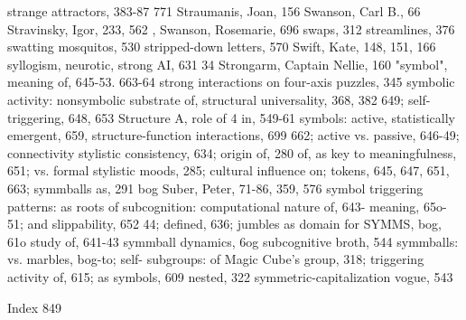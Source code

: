 strange attractors, 383-87                       771
Straumanis, Joan, 156                           Swanson, Carl B., 66
Stravinsky, Igor, 233, 562 ,                    Swanson, Rosemarie, 696 swaps, 312
streamlines, 376                                swatting mosquitos, 530
stripped-down letters, 570                      Swift, Kate, 148, 151, 166 syllogism, neurotic,
strong AI, 631                                   34
Strongarm, Captain Nellie, 160                  "symbol", meaning of, 645-53. 663-64
strong interactions on four-axis puzzles, 345   symbolic activity: nonsymbolic substrate of,
structural universality, 368, 382                649; self-triggering, 648, 653
Structure A, role of 4 in, 549-61               symbols: active, statistically emergent, 659,
structure-function interactions, 699             662; active vs. passive, 646-49; connectivity
stylistic consistency, 634; origin of, 280       of, as key to meaningfulness, 651; vs. formal
stylistic moods, 285; cultural influence on;     tokens, 645, 647, 651, 663; symmballs as,
 291                                             bog
Suber, Peter, 71-86, 359, 576                   symbol triggering patterns: as roots of
subcognition: computational nature of, 643-      meaning, 65o-51; and slippability, 652
 44; defined, 636; jumbles as domain for         SYMMS, bog, 61o
 study of, 641-43                               symmball dynamics, 6og
subcognitive broth, 544                         symmballs: vs. marbles, bog-to; self-
subgroups: of Magic Cube's group, 318;           triggering activity of, 615; as symbols, 609
 nested, 322                                    symmetric-capitalization vogue, 543

 Index                                                                                     849

